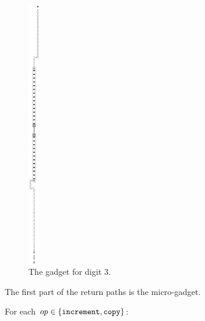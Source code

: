\begin{figure}[H]
    \centering
    \includegraphics[width=0.2in]{return_paths_return_from_digit_3}
    \caption{\label{fig:return_from_digit_3} The {\returnfromdigit} gadget for digit 3.}
\end{figure}


The first part of the return paths is the {\returnfromdigit} micro-gadget.

For each $op\in \{ {\tt increment}, {\tt copy} \}$:

